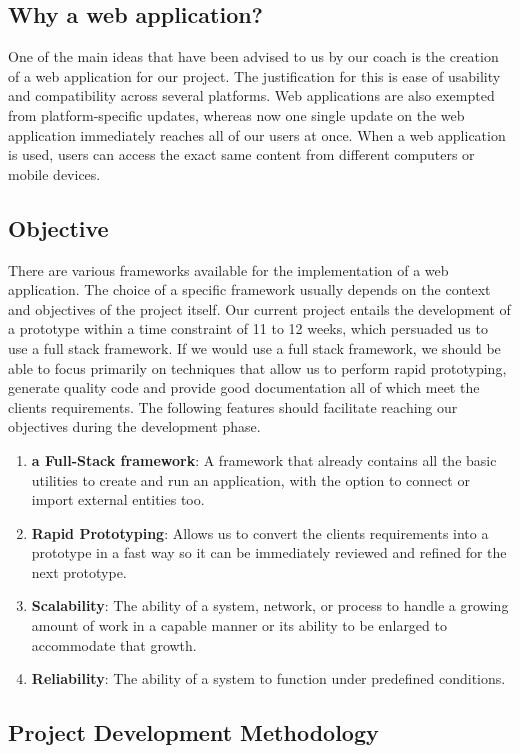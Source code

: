 \subsection{Why a web application?}
One of the main ideas that have been advised to us by our coach is the creation of a web application for our project. The justification for this is ease of usability and compatibility across several platforms. Web applications are also exempted from platform-specific updates, whereas now one single update on the web application immediately reaches all of our users at once. When a web application is used, users can access the exact same content from different computers or mobile devices.
\subsection{Objective}
There are various frameworks available for the implementation of a web application. The choice of a specific framework usually depends on the context and objectives of the project itself. Our current project entails the development of a prototype within a time constraint of 11 to 12 weeks, which persuaded us to use a full stack framework. If we would use a full stack framework, we should be able to focus primarily on techniques that allow us to perform rapid prototyping, generate quality code and provide good documentation all of which meet the clients requirements. The following features should facilitate reaching our objectives during the development phase.

\begin{enumerate}
	\item \textbf{a Full-Stack framework}: A framework that already contains all the basic utilities to create and run an application, with the option to connect or import external entities too.
	\item \textbf{Rapid Prototyping}: Allows us to convert the clients requirements into a prototype in a fast way so it can be immediately reviewed and refined for the next prototype.
	\item \textbf{Scalability}: The ability of a system, network, or process to handle a growing amount of work in a capable manner or its ability to be enlarged to accommodate that growth.\cite{wiki:scalability}
	\item \textbf{Reliability}: The ability of a system to function under predefined conditions.
\end{enumerate}
\subsection{Project Development Methodology} %

